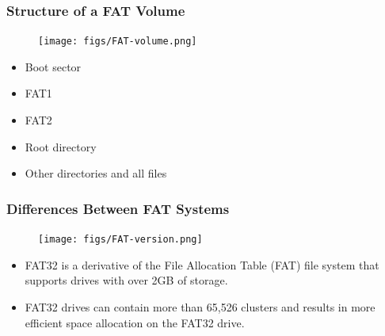 \iffalse
% 
% 
% 
% 
\begin{frame}[fragile]
    \frametitle{Structure of a FAT Volume}
        \begin{figure}
        \texttt{[image: figs/FAT-volume.png]}
        \end{figure}
    \begin{itemize}
        \item Boot sector \pause
        \item FAT1
        \item FAT2
        \item Root directory \pause
        \item Other directories and all files
    \end{itemize}
\end{frame}
% 
% 
% 
\begin{frame}[fragile]
    \frametitle{Differences Between FAT Systems}
    \begin{figure}
  \texttt{[image: figs/FAT-version.png]}
  \end{figure} \pause

    \begin{itemize}
        \item FAT32 is a derivative of the File Allocation Table (FAT) file system that supports drives with over 2GB of storage.
        \item FAT32 drives can contain more than 65,526 clusters and results in more efficient space allocation on the FAT32 drive.
    \end{itemize}
\end{frame}
